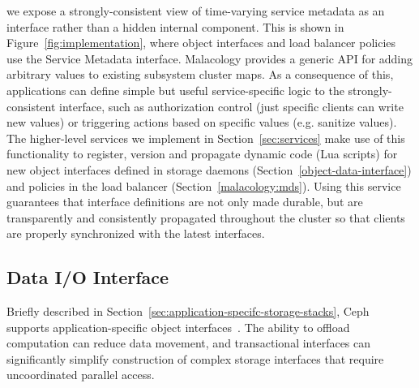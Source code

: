  we expose a strongly-consistent
view of time-varying service metadata as an interface rather than a hidden
internal component. This is shown in Figure~\ref{fig:implementation}, 
where object interfaces and load balancer policies use the Service Metadata
interface.
Malacology provides a generic API for adding arbitrary
values to existing subsystem cluster maps. As a consequence of this,
applications can define simple but useful service-specific logic to the
strongly-consistent interface, such as authorization control (just specific
clients can write new values) or triggering actions based on specific values
(e.g. sanitize values).  The higher-level services we implement in Section~\ref{sec:services} make use of this functionality to register, version and
propagate dynamic code (Lua scripts) for new object interfaces defined in
storage daemons (Section~\ref{object-data-interface}) and policies in the load
balancer (Section~\ref{malacology:mds}).  Using this service guarantees that interface
definitions are not only made durable, but are transparently and consistently
propagated throughout the cluster so that clients are properly synchronized
with the latest interfaces.\\

\noindent{} 


\subsection{Data I/O Interface}
\label{sec:data-io-interface}
\label{object-data-interface}

Briefly described in Section~\ref{sec:application-specifc-storage-stacks}, Ceph
supports application-specific object interfaces~\cite{weil_rados_2007}. The
ability to offload computation can reduce data movement, and transactional
interfaces can significantly simplify construction of complex storage
interfaces that require uncoordinated parallel access.

